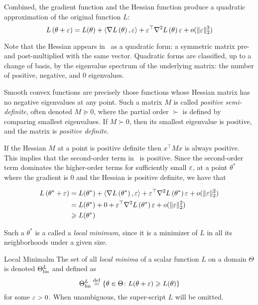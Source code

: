 \documentclass[../../thesis.tex]{subfiles}
\begin{document}
Combined, the gradient function and the Hessian function produce a quadratic approximation
of the original function $L$:
\begin{equation}
	L\left(\theta + \eps\right) =
	L(\theta)
	+ \langle\grad{L}{\theta},\eps\rangle
	+ \eps^\top\hess{L}{\theta}\eps + o(\snormt{\eps})\equationlabel{taylor-two}
\end{equation}

Note that the Hessian appears in~
as a quadratic form:
a symmetric matrix pre- and post-multiplied with the same vector.
Quadratic forms are classified,
up to a change of basis, by the eigenvalue spectrum
of the underlying matrix:
the number of positive, negative, and 0 eigenvalues.

Smooth convex functions are precisely those functions whose
Hessian matrix has no negative eigenvalues at any
point.
Such a matrix $M$ is called \emph{positive semi-definite},
often denoted $M \succeq 0$,
where the partial order $\succ$ is defined by
comparing smallest eigenvalues.
If $M \succ 0$, then its smallest eigenvalue is positive,
and the matrix is \emph{positive definite}.

If the Hessian $M$ at a point is positive definite
then $x^\top M x$ is always positive.
This implies that the second-order term in~
is positive.
Since the second-order term dominates the higher-order terms
for sufficiently small $\varepsilon$,
at a point $\theta^*$ where the gradient is $0$
and the Hessian is positive definite,
we have that

\begin{align}
	L\left(\theta^* + \varepsilon\right) &=
	L(\theta^*)
	+ \langle\nabla L\left(\theta^*\right),\varepsilon\rangle
	+ \varepsilon^\top\nabla^2L\left(\theta^*\right)\varepsilon + o(\lVert\varepsilon\rVert_{\scriptstyle2}^2)\\
	&=
	L(\theta^*)
	+ 0
	+ \varepsilon^\top\nabla^2L\left(\theta^*\right)\varepsilon + o(\lVert\varepsilon\rVert_{\scriptstyle2}^2)\\
	&\geqslant
	L(\theta^*)
\end{align}

Such a $\theta^*$ is a called a \emph{local minimum},
since it is a minimizer of $L$ in all its neighborhoods
under a given size.
\begin{definition}{Local Minima}{lm}
	The set of all \emph{local minima} of a scalar function $L$
	on a domain $\Theta$ is denoted $\Theta^L_{\mathrm{lm}}$ and defined as
	\begin{equation}\equationlabel{def-thetalm}
		\Theta^L_{\lm} \defeq
		\Set{\theta \in \Theta \suchthat L(\theta + \eps) \geq L(\theta)}
	\end{equation}
	for some $\varepsilon > 0$.
	When unambiguous, the super-script $L$ will be omitted.
\end{definition}
\end{document}
